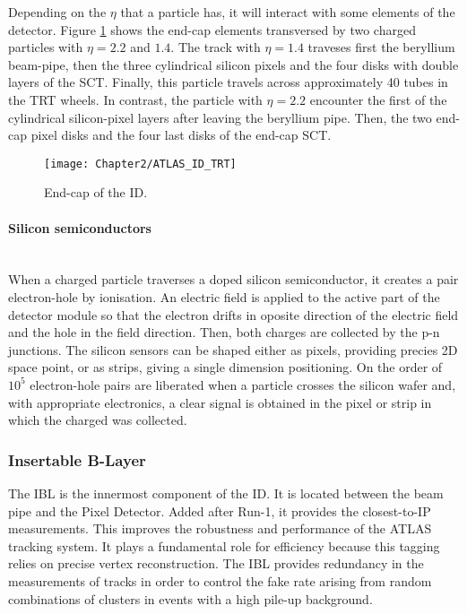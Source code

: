 Depending on the $\eta$ that a particle has, it will interact with some elements of the detector.
Figure \ref{fig:Chap2:ATLAS:ID_Endcap} shows the end-cap elements transversed by
two charged particles with $\eta = 2.2$ and $1.4$. The track with $\eta = 1.4$ traveses first the beryllium beam-pipe, then the three
cylindrical silicon pixels and the four disks with double layers of the SCT. Finally, this particle travels across approximately 40 tubes
in the TRT wheels. In contrast, the particle with $\eta = 2.2$ encounter the first of the cylindrical silicon-pixel layers after leaving
the beryllium pipe. Then, the two end-cap pixel disks and the four last disks of the end-cap SCT.

\begin{figure}
	\centering
 	 \texttt{[image: Chapter2/ATLAS\_ID\_TRT]}
	 \caption{End-cap of the ID.}
	\label{fig:Chap2:ATLAS:ID_Endcap}
\end{figure}

\paragraph{Silicon semiconductors}\mbox{}\\
When a charged particle traverses a doped silicon semiconductor, it creates a pair electron-hole by ionisation.
An electric field is applied to the active part of the detector module so that the electron drifts in oposite direction
of the electric field and the hole in the field direction. Then, both charges are collected by the p-n junctions. 
The silicon sensors can be shaped either as pixels, providing precies 2D space point, or as strips, giving
a single dimension positioning.
On the order of $10^5$ electron-hole pairs are liberated when a particle crosses the silicon wafer and, with 
appropriate electronics, a clear signal is obtained in the pixel or strip in which the charged was collected. 


\subsubsection{Insertable B-Layer}
\label{sec:Chap2:ID:B-Layer}
The IBL \cite{Capeans:1291633} is the innermost component of the ID. It is located between the beam pipe and
the Pixel Detector.  Added after Run-1, it provides the closest-to-IP measurements. This improves the robustness 
and performance of the ATLAS tracking system. It plays a fundamental role for \btag
efficiency because this tagging relies on precise vertex reconstruction. The IBL provides redundancy in the measurements 
of tracks in order to control the fake rate arising from random combinations of clusters in events with a high pile-up background.

